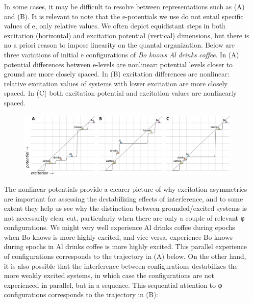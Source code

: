    In some cases, it may be difficult to resolve between representations such as (A) and (B). It is relevant to note that the e-potentials we use do not entail specific values of e, only relative values. We often depict equidistant steps in both excitation (horizontal) and excitation potential (vertical) dimensions, but there is no a priori reason to impose linearity on the quantal organization. Below are three variations of initial e configurations of \textit{Bo knows Al drinks coffee}. In (A) potential differences between e-levels are nonlinear: potential levels closer to ground are more closely spaced. In (B) excitation differences are nonlinear: relative excitation values of systems with lower excitation are more closely spaced. In (C) both excitation potential and excitation values are nonlinearly spaced.

  
\begin{figure}
\includegraphics[width=\textwidth]{figures/Tilsen-img96.png}
\caption{\missingcaption}
\label{fig:4:46}
\end{figure}
   

  The nonlinear potentials provide a clearer picture of why excitation asymmetries are important for assessing the destabilizing effects of interference, and to some extent they help us see why the distinction between grounded/excited systems is not necessarily clear cut, particularly when there are only a couple of relevant φ configurations. We might very well experience {\textbar}Al drinks coffee{\textbar} during epochs when {\textbar}Bo knows{\textbar} is more highly excited, and vice versa, experience {\textbar}Bo knows{\textbar} during epochs in {\textbar}Al drinks coffee{\textbar} is more highly excited. This parallel experience of configurations corresponds to the trajectory in (A) below. On the other hand, it is also possible that the interference between configurations destabilizes the more weakly excited systems, in which case the configurations are not experienced in parallel, but in a sequence. This sequential attention to φ configurations corresponds to the trajectory in (B):


